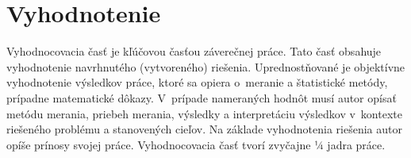 
\chapter{Vyhodnotenie}
\label{evaluation}

Vyhodnocovacia časť je kľúčovou časťou záverečnej práce. Tato časť obsahuje vyhodnotenie navrhnutého (vytvoreného) riešenia. Uprednostňované je objektívne vyhodnotenie výsledkov práce, ktoré sa opiera o~meranie a štatistické metódy, prípadne matematické dôkazy. V~prípade nameraných hodnôt musí autor opísať metódu merania, priebeh merania, výsledky a interpretáciu výsledkov v~kontexte riešeného problému a stanovených cieľov. Na základe vyhodnotenia riešenia autor opíše prínosy svojej práce. Vyhodnocovacia časť tvorí zvyčajne ¼ jadra práce.
